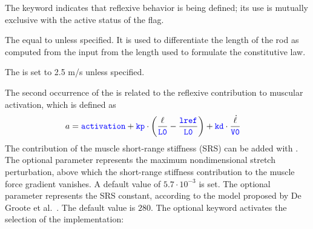 The  keyword indicates that reflexive behavior is being defined;
its use is mutually exclusive with the active status of the  flag.

The  equal to  unless specified.
It is used to differentiate the length of the rod as computed from the input
from the length used to formulate the constitutive law.

The  is set to 2.5 m/s unless specified.

The second occurrence of the  is related
to the reflexive contribution to muscular activation, which is defined as
\begin{align}
	a
	&=
	\textcolor{blue}{\texttt{activation}}
	+
	\textcolor{blue}{\texttt{kp}} \cdot \left( 
		\frac{\ell}{\textcolor{blue}{\texttt{L0}}}
		-
		\frac{\textcolor{blue}{\texttt{lref}}}{\textcolor{blue}{\texttt{L0}}}
	 \right)
	+
	\textcolor{blue}{\texttt{kd}} \cdot \frac{\dot{\ell}}{\textcolor{blue}{\texttt{V0}}}
\end{align}
The contribution of the muscle short-range stiffness (SRS) can be added with . The optional  parameter  represents the maximum nondimensional
stretch perturbation, above which the short-range stiffness contribution to the muscle
force gradient vanishes. A default value of $5.7\cdot10^{-3}$ is set. The optional
parameter  represents the SRS constant, according to the model proposed by
De Groote et al.~\cite{DEGROOTE-2017-SRS}. The default value is $280$.
The optional keyword  activates the selection of the implementation: 
